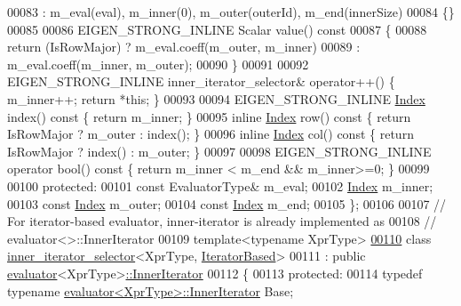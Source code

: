 \begin{DoxyCode}
00083     : m\_eval(eval), m\_inner(0), m\_outer(outerId), m\_end(innerSize)
00084   \{\}
00085 
00086   EIGEN\_STRONG\_INLINE Scalar value()\textcolor{keyword}{ const}
00087 \textcolor{keyword}{  }\{
00088     \textcolor{keywordflow}{return} (IsRowMajor) ? m\_eval.coeff(m\_outer, m\_inner)
00089                         : m\_eval.coeff(m\_inner, m\_outer);
00090   \}
00091 
00092   EIGEN\_STRONG\_INLINE inner\_iterator\_selector& operator++() \{ m\_inner++; \textcolor{keywordflow}{return} *\textcolor{keyword}{this}; \}
00093 
00094   EIGEN\_STRONG\_INLINE \hyperlink{namespace_eigen_a62e77e0933482dafde8fe197d9a2cfde}{Index} index()\textcolor{keyword}{ const }\{ \textcolor{keywordflow}{return} m\_inner; \}
00095   \textcolor{keyword}{inline} \hyperlink{namespace_eigen_a62e77e0933482dafde8fe197d9a2cfde}{Index} row()\textcolor{keyword}{ const }\{ \textcolor{keywordflow}{return} IsRowMajor ? m\_outer : index(); \}
00096   \textcolor{keyword}{inline} \hyperlink{namespace_eigen_a62e77e0933482dafde8fe197d9a2cfde}{Index} col()\textcolor{keyword}{ const }\{ \textcolor{keywordflow}{return} IsRowMajor ? index() : m\_outer; \}
00097 
00098   EIGEN\_STRONG\_INLINE \textcolor{keyword}{operator} bool()\textcolor{keyword}{ const }\{ \textcolor{keywordflow}{return} m\_inner < m\_end && m\_inner>=0; \}
00099 
00100 \textcolor{keyword}{protected}:
00101   \textcolor{keyword}{const} EvaluatorType& m\_eval;
00102   \hyperlink{namespace_eigen_a62e77e0933482dafde8fe197d9a2cfde}{Index} m\_inner;
00103   \textcolor{keyword}{const} \hyperlink{namespace_eigen_a62e77e0933482dafde8fe197d9a2cfde}{Index} m\_outer;
00104   \textcolor{keyword}{const} \hyperlink{namespace_eigen_a62e77e0933482dafde8fe197d9a2cfde}{Index} m\_end;
00105 \};
00106 
00107 \textcolor{comment}{// For iterator-based evaluator, inner-iterator is already implemented as}
00108 \textcolor{comment}{// evaluator<>::InnerIterator}
00109 \textcolor{keyword}{template}<\textcolor{keyword}{typename} XprType>
\hyperlink{class_eigen_1_1internal_1_1inner__iterator__selector_3_01_xpr_type_00_01_iterator_based_01_4}{00110} \textcolor{keyword}{class }\hyperlink{class_eigen_1_1internal_1_1inner__iterator__selector}{inner\_iterator\_selector}<XprType, \hyperlink{struct_eigen_1_1internal_1_1_iterator_based}{IteratorBased}>
00111  : \textcolor{keyword}{public} \hyperlink{struct_eigen_1_1internal_1_1evaluator}{evaluator}<XprType>\hyperlink{class_eigen_1_1_inner_iterator}{::InnerIterator}
00112 \{
00113 \textcolor{keyword}{protected}:
00114   \textcolor{keyword}{typedef} \textcolor{keyword}{typename} \hyperlink{struct_eigen_1_1internal_1_1evaluator}{evaluator<XprType>::InnerIterator} Base;

\end{DoxyCode}
